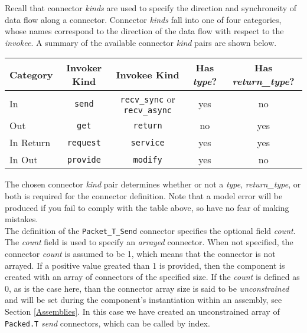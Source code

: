 Recall that connector \textit{kinds} are used to specify the direction and synchroneity of data flow along a connector. Connector \textit{kinds} fall into one of four categories, whose names correspond to the direction of the data flow with respect to the \textit{invokee}. A summary of the available connector \textit{kind} pairs are shown below.

\vspace{5mm} %
\begin{center}
  \begin{tabular}{ | l | c | c | c | c |}
    \hline
    \textbf{Category} & \textbf{Invoker Kind} & \textbf{Invokee Kind} & \textbf{Has \textit{type}?} & \textbf{Has \textit{return\_type}?} \\ \hline
    In & \texttt{send} & \texttt{recv\_sync} or \texttt{recv\_async} & yes & no \\ \hline
    Out & \texttt{get} & \texttt{return} & no & yes \\ \hline
    In Return & \texttt{request} & \texttt{service} & yes & yes \\ \hline
    In Out & \texttt{provide} & \texttt{modify} & yes & no \\ \hline
  \end{tabular}
\end{center}
\vspace{5mm} %

The chosen connector \textit{kind} pair determines whether or not a \textit{type}, \textit{return\_type}, or both is required for the connector definition. Note that a model error will be produced if you fail to comply with the table above, so have no fear of making mistakes. \\

The definition of the \texttt{Packet\_T\_Send} connector specifies the optional field \textit{count}. The \textit{count} field is used to specify an \textit{arrayed} connector. When not specified, the connector \textit{count} is assumed to be 1, which means that the connector is not arrayed. If a positive value greated than 1 is provided, then the component is created with an array of connectors of the specified size. If the \textit{count} is defined as 0, as is the case here, than the connector array size is said to be \textit{unconstrained} and will be set during the component's instantiation within an assembly, see Section \ref{Assemblies}. In this case we have created an unconstrained array of \texttt{Packed.T} \textit{send} connectors, which can be called by index. \\

